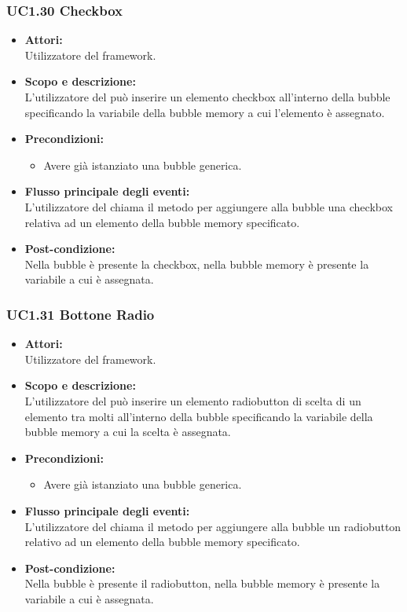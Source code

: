 \subsubsection{UC1.30 Checkbox} \label{UC1.30}

\begin{itemize}
	\item \textbf{Attori:}
	\\Utilizzatore del framework.
	\item \textbf{Scopo e descrizione:} 
	\\L’utilizzatore del  può inserire un elemento checkbox all’interno della bubble specificando la variabile della bubble memory a cui l'elemento è assegnato.
	\item \textbf{Precondizioni:}
	\begin{itemize}
		\item Avere già istanziato una bubble generica.
	\end{itemize}
	\item \textbf{Flusso principale degli eventi:}
	\\L’utilizzatore del  chiama il metodo per aggiungere alla bubble una checkbox relativa ad un elemento della bubble memory specificato.
	\item \textbf{Post-condizione:}
	\\Nella bubble è presente la checkbox, nella bubble memory è presente la variabile a cui è assegnata.
\end{itemize}

\subsubsection{UC1.31 Bottone Radio} \label{UC1.31}

\begin{itemize}
	\item \textbf{Attori:}
	\\Utilizzatore del framework.
	\item \textbf{Scopo e descrizione:} 
	\\L’utilizzatore del  può inserire un elemento radiobutton di scelta di un elemento tra molti all’interno della bubble specificando la variabile della bubble memory a cui la scelta è assegnata.
	\item \textbf{Precondizioni:}
	\begin{itemize}
		\item Avere già istanziato una bubble generica.
	\end{itemize}
	\item \textbf{Flusso principale degli eventi:}
	\\L’utilizzatore del  chiama il metodo per aggiungere alla bubble un radiobutton relativo ad un elemento della bubble memory specificato.
	\item \textbf{Post-condizione:}
	\\Nella bubble è presente il radiobutton, nella bubble memory è presente la variabile a cui è assegnata.
\end{itemize}


